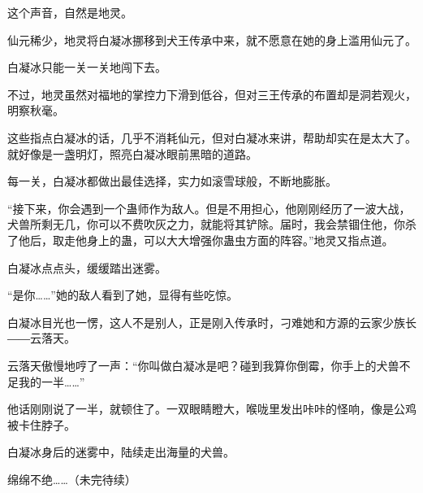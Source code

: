 \begin{this_body}
这个声音，自然是地灵。

仙元稀少，地灵将白凝冰挪移到犬王传承中来，就不愿意在她的身上滥用仙元了。

白凝冰只能一关一关地闯下去。

不过，地灵虽然对福地的掌控力下滑到低谷，但对三王传承的布置却是洞若观火，明察秋毫。

这些指点白凝冰的话，几乎不消耗仙元，但对白凝冰来讲，帮助却实在是太大了。就好像是一盏明灯，照亮白凝冰眼前黑暗的道路。

每一关，白凝冰都做出最佳选择，实力如滚雪球般，不断地膨胀。

“接下来，你会遇到一个蛊师作为敌人。但是不用担心，他刚刚经历了一波大战，犬兽所剩无几，你可以不费吹灰之力，就能将其铲除。届时，我会禁锢住他，你杀了他后，取走他身上的蛊，可以大大增强你蛊虫方面的阵容。”地灵又指点道。

白凝冰点点头，缓缓踏出迷雾。

“是你……”她的敌人看到了她，显得有些吃惊。

白凝冰目光也一愣，这人不是别人，正是刚入传承时，刁难她和方源的云家少族长――云落天。

云落天傲慢地哼了一声：“你叫做白凝冰是吧？碰到我算你倒霉，你手上的犬兽不足我的一半……”

他话刚刚说了一半，就顿住了。一双眼睛瞪大，喉咙里发出咔咔的怪响，像是公鸡被卡住脖子。

白凝冰身后的迷雾中，陆续走出海量的犬兽。

绵绵不绝……（未完待续）

\end{this_body}


